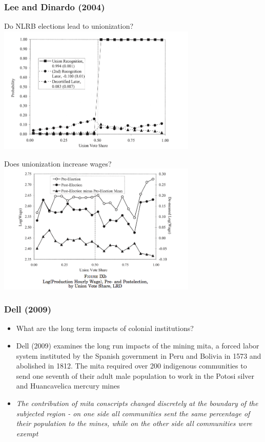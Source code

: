 \documentclass{beamer}
\begin{document}
\begin{frame}
  \frametitle{Lee and Dinardo (2004)}
Do NLRB elections lead to unionization?
\includegraphics[width=9.5cm]{Lee_Dinardo_Forcing.png}  
\end{frame}

\begin{frame}
Does unionization increase wages?
\includegraphics[width=9.5cm]{Lee_Dinardo_Output.png}  

\end{frame}


\begin{frame}
  \frametitle{Dell (2009)}
  \begin{itemize} 
  \item What are the long term impacts of colonial institutions?
  \item Dell (2009) examines the long run impacts of the mining mita, a forced
labor system instituted by the Spanish government in Peru and Bolivia
in 1573 and abolished in 1812. The mita required over 200 indigenous
communities to send one seventh of their adult male population to work
in the Potosi silver and Huancavelica mercury mines
  \item \textit{The contribution of mita conscripts changed discretely at the boundary of the subjected region - on one side all communities sent the same percentage of their population to the mines, while on the other side all communities were exempt}
  \end{itemize}
\end{frame}
\end{document}
